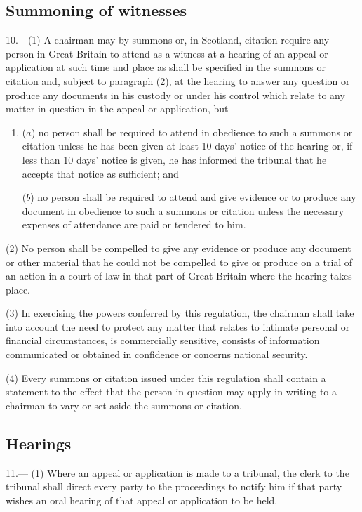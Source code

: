 \documentclass[a4paper]{article}
\begin{document}
\subsection[10. Summoning of witnesses]{Summoning of witnesses}

10.—(1) A chairman may by summons or, in Scotland, citation require any person in Great Britain to attend as a witness at a hearing of an appeal or application at such time and place as shall be specified in the summons or citation and, subject to paragraph (2), at the hearing to answer any question or produce any documents in his custody or under his control which relate to any matter in question in the appeal or application, but---
\begin{enumerate}\item[]
($a$) no person shall be required to attend in obedience to such a summons or citation unless he has been given at least 10 days' notice of the hearing or, if less than 10 days' notice is given, he has informed the tribunal that he accepts that notice as sufficient; and

($b$) no person shall be required to attend and give evidence or to produce any document in obedience to such a summons or citation unless the necessary expenses of attendance are paid or tendered to him.
\end{enumerate}

(2) No person shall be compelled to give any evidence or produce any document or other material that he could not be compelled to give or produce on a trial of an action in a court of law in that part of Great Britain where the hearing takes place.

(3) In exercising the powers conferred by this regulation, the chairman shall take into account the need to protect any matter that relates to intimate personal or financial circumstances, is commercially sensitive, consists of information communicated or obtained in confidence or concerns national security.

(4) Every summons or citation issued under this regulation shall contain a statement to the effect that the person in question may apply in writing to a chairman to vary or set aside the summons or citation.

\subsection[11. Hearings]{Hearings}

11.—%
%
(1) Where an appeal or application is made to a tribunal, the clerk to the tribunal shall direct every party to the proceedings to notify him if that party wishes an oral hearing of that appeal or application to be held.
\end{document}
